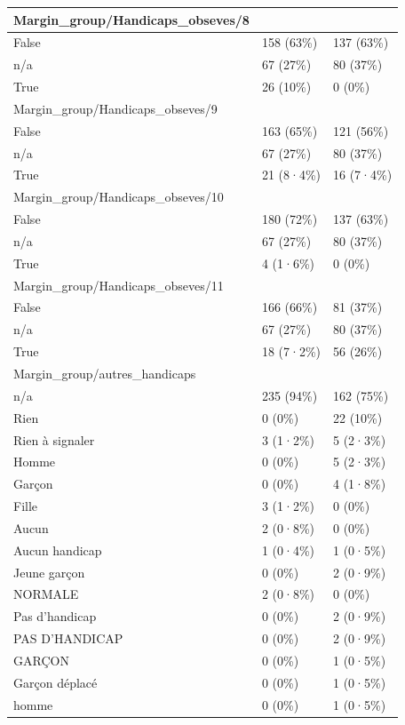 \documentclass[
]{book}
\begin{document}
\begin{tabular}{l|l|l}
\hline
Margin\_group/Handicaps\_obseves/8 &  & \\
\hline
False & 158 (63\%) & 137 (63\%)\\
\hline
n/a & 67 (27\%) & 80 (37\%)\\
\hline
True & 26 (10\%) & 0 (0\%)\\
\hline
Margin\_group/Handicaps\_obseves/9 &  & \\
\hline
False & 163 (65\%) & 121 (56\%)\\
\hline
n/a & 67 (27\%) & 80 (37\%)\\
\hline
True & 21 (8·4\%) & 16 (7·4\%)\\
\hline
Margin\_group/Handicaps\_obseves/10 &  & \\
\hline
False & 180 (72\%) & 137 (63\%)\\
\hline
n/a & 67 (27\%) & 80 (37\%)\\
\hline
True & 4 (1·6\%) & 0 (0\%)\\
\hline
Margin\_group/Handicaps\_obseves/11 &  & \\
\hline
False & 166 (66\%) & 81 (37\%)\\
\hline
n/a & 67 (27\%) & 80 (37\%)\\
\hline
True & 18 (7·2\%) & 56 (26\%)\\
\hline
Margin\_group/autres\_handicaps &  & \\
\hline
n/a & 235 (94\%) & 162 (75\%)\\
\hline
Rien & 0 (0\%) & 22 (10\%)\\
\hline
Rien à signaler & 3 (1·2\%) & 5 (2·3\%)\\
\hline
Homme & 0 (0\%) & 5 (2·3\%)\\
\hline
Garçon & 0 (0\%) & 4 (1·8\%)\\
\hline
Fille & 3 (1·2\%) & 0 (0\%)\\
\hline
Aucun & 2 (0·8\%) & 0 (0\%)\\
\hline
Aucun handicap & 1 (0·4\%) & 1 (0·5\%)\\
\hline
Jeune garçon & 0 (0\%) & 2 (0·9\%)\\
\hline
NORMALE & 2 (0·8\%) & 0 (0\%)\\
\hline
Pas d'handicap & 0 (0\%) & 2 (0·9\%)\\
\hline
PAS D'HANDICAP & 0 (0\%) & 2 (0·9\%)\\
\hline
GARÇON & 0 (0\%) & 1 (0·5\%)\\
\hline
Garçon déplacé & 0 (0\%) & 1 (0·5\%)\\
\hline
homme & 0 (0\%) & 1 (0·5\%)\\

\end{tabular}
\end{document}

